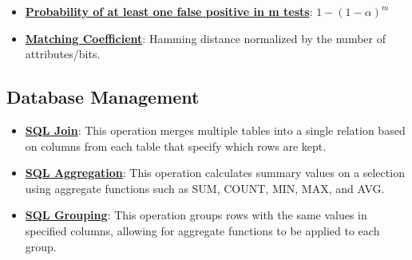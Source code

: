 \documentclass{article}%
\begin{document}
\begin{itemize}[leftmargin=*]
\item \href{https://purdue.brightspace.com/d2l/common/assets/pdfjs-d2l-dist/1.0.14-legacy/web/viewer.html?file=\%2Fcontent\%2Fenforced\%2F1095465-WL.202510.CS24200.LE1\%2F15L2-AB-testing.pdf\%3Fou\%3D1095465\&lang=en-us\&container=d2l-fileviewer-rendered-pdf\&fullscreen=d2l-fileviewer-rendered-pdf-dialog\&height=667#page=28}{\textbf{Probability of at least one false positive in m tests}}: $1 - (1 - \alpha)^m$%
\item \href{https://purdue.brightspace.com/d2l/common/assets/pdfjs-d2l-dist/1.0.14-legacy/web/viewer.html?file=\%2Fcontent\%2Fenforced\%2F1095465-WL.202510.CS24200.LE1\%2F17L2-distance-clusters.pdf\%3Fou\%3D1095465\&lang=en-us\&container=d2l-fileviewer-rendered-pdf\&fullscreen=d2l-fileviewer-rendered-pdf-dialog\&height=667#page=19}{\textbf{Matching Coefficient}}: Hamming distance normalized by the number of attributes/bits.%
\end{itemize}

%
\subsection{Database Management}%
\label{subsec:DatabaseManagement}%
\begin{itemize}[leftmargin=*]%
\item \href{https://purdue.brightspace.com/d2l/common/assets/pdfjs-d2l-dist/1.0.14-legacy/web/viewer.html?file=\%2Fcontent\%2Fenforced\%2F1095465-WL.202510.CS24200.LE1\%2F23L2-relationaldb-sql.pdf\%3Fou\%3D1095465\&lang=en-us\&container=d2l-fileviewer-rendered-pdf\&fullscreen=d2l-fileviewer-rendered-pdf-dialog\&height=667#page=28}{\textbf{SQL Join}}: This operation merges multiple tables into a single relation based on columns from each table that specify which rows are kept.%
\item \href{https://purdue.brightspace.com/d2l/common/assets/pdfjs-d2l-dist/1.0.14-legacy/web/viewer.html?file=\%2Fcontent\%2Fenforced\%2F1095465-WL.202510.CS24200.LE1\%2F23L2-relationaldb-sql.pdf\%3Fou\%3D1095465\&lang=en-us\&container=d2l-fileviewer-rendered-pdf\&fullscreen=d2l-fileviewer-rendered-pdf-dialog\&height=667#page=45}{\textbf{SQL Aggregation}}: This operation calculates summary values on a selection using aggregate functions such as SUM, COUNT, MIN, MAX, and AVG.%
\item \href{https://purdue.brightspace.com/d2l/common/assets/pdfjs-d2l-dist/1.0.14-legacy/web/viewer.html?file=\%2Fcontent\%2Fenforced\%2F1095465-WL.202510.CS24200.LE1\%2F23L2-relationaldb-sql.pdf\%3Fou\%3D1095465\&lang=en-us\&container=d2l-fileviewer-rendered-pdf\&fullscreen=d2l-fileviewer-rendered-pdf-dialog\&height=667#page=47}{\textbf{SQL Grouping}}: This operation groups rows with the same values in specified columns, allowing for aggregate functions to be applied to each group.%
\end{itemize}
\end{document}
